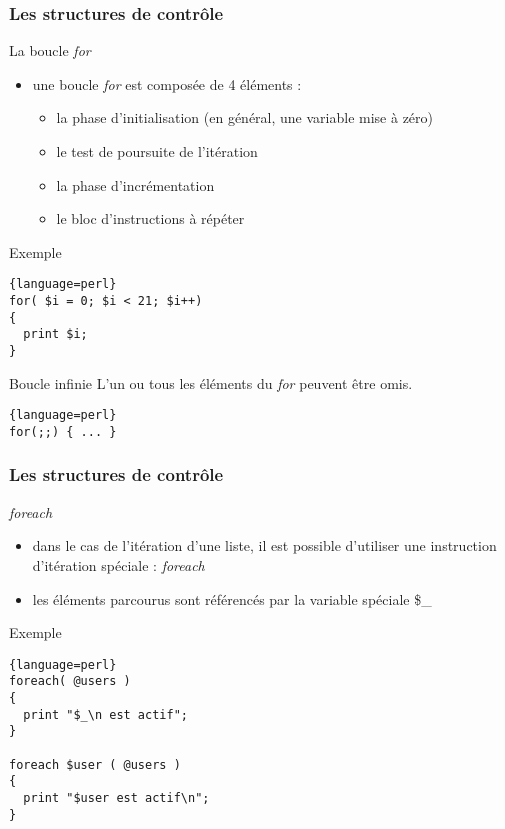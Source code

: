 \begin{frame}[fragile]
  \frametitle{Les structures de contrôle}

  \begin{block}{La boucle \textit{for}}
    \begin{itemize}
    \item une boucle \textit{for} est composée de 4 éléments :
      \begin{itemize}
      \item la phase d'initialisation (en général, une variable mise à zéro)
      \item le test de poursuite de l'itération
      \item la phase d'incrémentation
      \item le bloc d'instructions à répéter
      \end{itemize}
    \end{itemize}
  \end{block}

  \begin{exampleblock}{Exemple}
    \begin{lstlisting}{language=perl}
for( $i = 0; $i < 21; $i++)
{
  print $i;
}
    \end{lstlisting}
  \end{exampleblock}

  \begin{alertblock}{Boucle infinie}
    L'un ou tous les éléments du \textit{for} peuvent être omis.
    \begin{lstlisting}{language=perl}
for(;;) { ... }
    \end{lstlisting}
  \end{alertblock}

\end{frame}

\begin{frame}[fragile]
  \frametitle{Les structures de contrôle}

  \begin{block}{\textit{foreach}}
    \begin{itemize}
    \item dans le cas de l'itération d'une liste, il est possible d'utiliser
      une instruction d'itération spéciale : \textit{foreach}
    \item les éléments parcourus sont référencés par la variable spéciale
      \$\_
    \end{itemize}
  \end{block}

  \begin{exampleblock}{Exemple}
    \begin{lstlisting}{language=perl}
foreach( @users )
{
  print "$_\n est actif";
}

foreach $user ( @users )
{
  print "$user est actif\n";
}
    \end{lstlisting}
  \end{exampleblock}
\end{frame}

